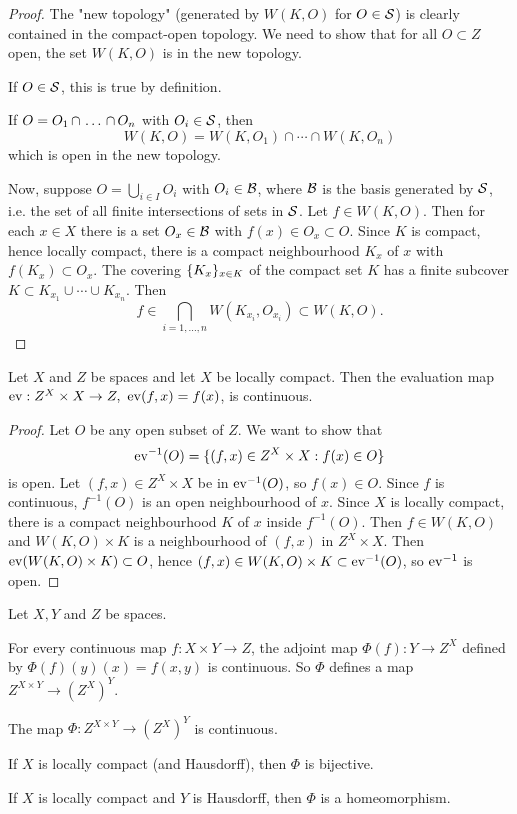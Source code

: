 \begin{proof}
The "new topology" (generated by $W(K,O)$ for $O\in\S$) is clearly contained in the compact-open topology. We need to show that for all $O\subset Z$ open, the set $W(K,O)$ is in the new topology.

If $O\in\S$, this is true by definition.

If $O=\nns{O}{\cap}{n}$ with $O_i\in\S$, then
\[W(K,O)=W(K,O_1)\cap\cdots\cap W(K,O_n)\]
which is open in the new topology.

Now, suppose $O=\bigcup_{i\in I}O_i$ with $O_i\in\Bb$, where $\Bb$ is the basis generated by $\S$, i.e. the set of all finite intersections of sets in $\S$. Let $f\in W(K,O)$. Then for each $x\in X$ there is a set $O_x\in\Bb$ with $f(x)\in O_x\subset O$. Since $K$ is compact, hence locally compact, there is a compact neighbourhood $K_x$ of $x$ with $f(K_x)\subset O_x$. The covering $\cb{K_x}_{x\in K}$ of the compact set $K$ has a finite subcover $K\subset K_{x_1}\cup\cdots\cup K_{x_n}$. Then
\[f\in \bigcap_{i=1,\dots,n}W(K_{x_i},O_{x_i})\subset W(K,O).\]
\end{proof}

\begin{theorem}
Let $X$ and $Z$ be spaces and let $X$ be locally compact. Then the evaluation map $\ev:Z^X\times X\to Z,\ \ev(f,x)=f(x)$, is continuous.
\end{theorem}

\begin{proof}
Let $O$ be any open subset of $Z$. We want to show that
\[\ev^{-1}(O)=\cb{(f,x)\in Z^X\times X:f(x)\in O}\]
is open. Let $(f,x)\in Z^X\times X$ be in $\ev^{-1}(O)$, so $f(x)\in O$. Since $f$ is continuous, $f^{-1}(O)$ is an open neighbourhood of $x$. Since $X$ is locally compact, there is a compact neighbourhood $K$ of $x$ inside $f^{-1}(O)$. Then $f\in W(K,O)$ and $W(K,O)\times K$ is a neighbourhood of $(f,x)$ in $Z^X\times X$. Then $\ev(W(K,O)\times K)\subset O$, hence $(f,x)\in W(K,O)\times K\subset\ev^{-1}(O)$, so $\ev^{-1}$ is open.
\end{proof}

\begin{theorem}
Let $X,Y$ and $Z$ be spaces.
\begin{numerate}
    \setcounter{enumi}{-1}
    \item For every continuous map $f:X\times Y\to Z$, the adjoint map $\Phi(f):Y\to Z^X$ defined by $\Phi(f)(y)(x)=f(x,y)$ is continuous. So $\Phi$ defines a map $Z^{X\times Y}\to(Z^X)^Y$.
    \item The map $\Phi:Z^{X\times Y}\to(Z^X)^Y$ is continuous.
    \item If $X$ is locally compact (and Hausdorff), then $\Phi$ is bijective.
    \item If $X$ is locally compact and $Y$ is Hausdorff, then $\Phi$ is a homeomorphism.
\end{numerate}
\end{theorem}

